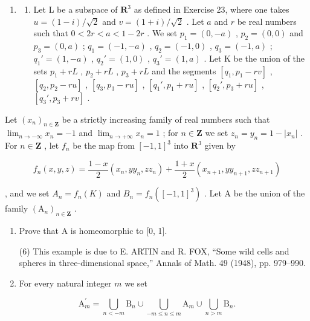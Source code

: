 \begin{enumerate}
\def\labelenumi{\arabic{enumi})}
\setcounter{enumi}{32}
\tightlist
\item
  \begin{enumerate}
  \def\labelenumii{(\arabic{enumii})}
  \setcounter{enumii}{5}
  \tightlist
  \item
    Let L be a subspace of \(\mathbf{R}^3\) as defined in Exercise 23, where one takes \(u = (1 - i)/\sqrt{2}\) and \(v = (1 + i)/\sqrt{2}\) . Let \(a\) and \(r\) be real numbers such that \(0 < 2r < a < 1 - 2r\) . We set \(p_1 = (0, -a)\) , \(p_2 = (0, 0)\) and \(p_3 = (0, a)\) ; \(q_1 = (-1, -a)\) , \(q_2 = (-1, 0)\) , \(q_3 = (-1, a)\) ; \(q_1' = (1, -a)\) , \(q_2' = (1, 0)\) , \(q_3' = (1, a)\) . Let K be the union of the sets \(p_1 + rL\) , \(p_2 + rL\) , \(p_3 + rL\) and the segments \([q_1, p_1 - rv]\) , \([q_2, p_2 - ru]\) , \([q_3, p_3 - ru]\) , \([q_1', p_1 + ru]\) , \([q_2', p_3 + ru]\) , \([q_3', p_3 + rv]\) .
  \end{enumerate}
\end{enumerate}

Let \((x_{n})_{n\in \mathbf{Z}}\) be a strictly increasing family of real numbers such that \(\lim_{n\to -\infty}x_n = -1\) and \(\lim_{n\to +\infty}x_n = 1\) ; for \(n\in \mathbf{Z}\) we set \(z_{n} = y_{n} = 1 - |x_{n}|\) . For \(n\in \mathbf{Z}\) , let \(f_{n}\) be the map from \([-1,1]^{3}\) into \(\mathbf{R}^3\) given by

\[
f _ {n} (x, y, z) = \frac {1 - x}{2} (x _ {n}, y y _ {n}, z z _ {n}) + \frac {1 + x}{2} (x _ {n + 1}, y y _ {n + 1}, z z _ {n + 1})
\]

, and we set \(A_{n}=f_{n}(K)\) and \(B_{n}=f_{n}([-1,1]^{3})\) . Let A be the union of the family \((\mathrm{A}_{n})_{n\in\mathbf{Z}}\) .

\begin{enumerate}
\def\labelenumi{\alph{enumi})}
\item
  Prove that A is homeomorphic to [0, 1].

(6) This example is due to E. ARTIN and R. FOX, “Some wild cells and spheres in three-dimensional space,” Annals of Math. 49 (1948), pp. 979–990.

\item
  For every natural integer \(m\) we set
\end{enumerate}

\[
\mathrm{A} _ {m} ^ {\prime} = \bigcup_ {n <   - m} \mathrm{B} _ {n} \cup \bigcup_ {- m \leqslant n \leqslant m} \mathrm{A} _ {m} \cup \bigcup_ {n > m} \mathrm{B} _ {n}.
\]

